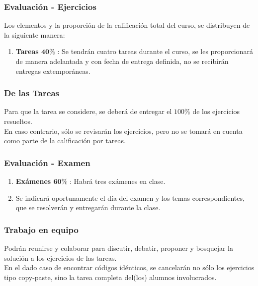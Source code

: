 \documentclass[12pt]{beamer}
\begin{document}
\begin{frame}
\frametitle{Evaluación - Ejercicios}
Los elementos y la proporción de la calificación total del curso, se distribuyen de la siguiente manera:
\begin{enumerate}[<+->]
\item \textbf{Tareas $\mathbf{40\%}$} : Se tendrán cuatro tareas durante el curso, se les proporcionará de manera adelantada y con fecha de entrega definida, no se recibirán entregas extemporáneas.
\seti
\end{enumerate}
\end{frame}
\begin{frame}
\frametitle{De las Tareas}
Para que la tarea se considere, se deberá de entregar el $100\%$ de los ejercicios resueltos.
\\
\bigskip
\pause
En caso contrario, sólo se revisarán los ejercicios, pero no se tomará en cuenta como parte de la calificación por tareas.
\end{frame}
\begin{frame}
\frametitle{Evaluación - Examen}
\begin{enumerate}[<+->]    
\conti
\item \textbf{Exámenes $\mathbf{60\%}$} : Habrá tres exámenes en clase. 
\item Se indicará oportunamente el día del examen y los temas correspondientes, que se resolverán y entregarán durante la clase.
\end{enumerate}
\end{frame}

\begin{frame}
\frametitle{Trabajo en equipo}
Podrán reunirse y colaborar para discutir, debatir, proponer y bosquejar la solución a los ejercicios de las tareas.
\\
\bigskip
En el dado caso de encontrar códigos idénticos, se cancelarán no sólo los ejercicios tipo copy-paste, sino la tarea completa del(los) alumnos involucrados.
\end{frame}
\end{document}
